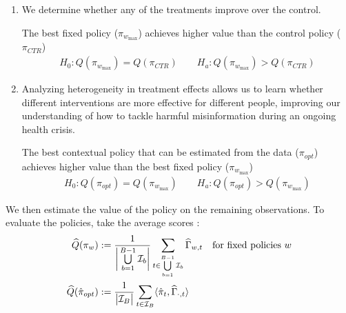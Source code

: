 \documentclass[letterpaper, 12pt, parskip=full,DIV=12]{scrartcl}
\begin{document}
\begin{enumerate}
\item[ ] 
We determine whether any of the treatments improve over the control. 
\begin{hypothesis} The best fixed policy ($\pi_{w_{\textrm{max} } }$) achieves higher value than the control policy ($\pi_{CTR}$)   \label{eq:control_null}
\begin{align*}
H_{0}: Q(\pi_{w_{\textrm{max} } }) = Q(\pi_{CTR}) \qquad H_{a}:  Q(\pi_{w_{\textrm{max} } }) > Q(\pi_{CTR})
\end{align*}
\end{hypothesis}
  \item[ ]
  
  Analyzing heterogeneity in treatment effects allows us to learn whether different interventions are more effective for different people, improving our understanding of how to tackle harmful misinformation during an ongoing health crisis.
  \begin{hypothesis}
  The best contextual policy that can be estimated from the data ($\pi_{opt}$) achieves higher value than the best fixed policy ($\pi_{w_{\textrm{max} } }$)\label{eq:bestfix_null}
\begin{align*}
  H_{0}: Q(\pi_{opt}) = Q(\pi_{w_{\textrm{max}}}) \qquad H_{a}:  Q(\pi_{opt}) > Q(\pi_{w_{\textrm{max}}})
\end{align*}
\end{hypothesis}
\end{enumerate}



We then estimate the value of the policy on the remaining observations. To evaluate the policies, take the average scores :
    \begin{align*}
          \widehat{Q}({\pi}_{w})  &:= \frac{1}{\bigg{\lvert} \bigcup\limits_{b=1}^{B-1} \mathcal{I}_{b} \bigg{\rvert}} \sum_{t \in \bigcup\limits_{b=1}^{B-1} \mathcal{I}_{b} } \widehat{\Gamma}_{w,t} \quad \text{for fixed policies $w$}\\
                     \widehat{Q}(\hat{\pi}_{opt})  &:= \frac{1}{\big{\lvert}  \mathcal{I}_{B} \big{\rvert}} \sum_{t \in \mathcal{I}_{B} }
                      \langle \hat{\pi}_{t}, \widehat{\Gamma}_{\cdot, t}  \rangle 
    \end{align*}










\clearpage


\end{document}
